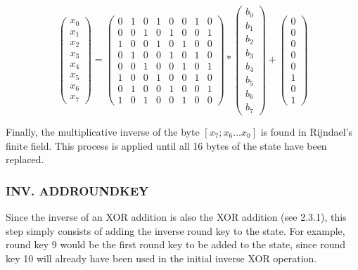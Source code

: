 \documentclass[12pt]{report}
\theoremstyle{definition}
\theoremstyle{remark}
\begin{document}
\[ 
\left( \begin{array}{c}
x_0 \\
x_1 \\
x_2 \\
x_3 \\
x_4 \\
x_5 \\
x_6 \\
x_7\end{array} \right)
=
\left( \begin{array}{cccccccc}
0 & 1 & 0 & 1 & 0 & 0 & 1 & 0 \\
0 & 0 & 1 & 0 & 1 & 0 & 0 & 1 \\
1 & 0 & 0 & 1 & 0 & 1 & 0 & 0 \\
0 & 1 & 0 & 0 & 1 & 0 & 1 & 0 \\
0 & 0 & 1 & 0 & 0 & 1 & 0 & 1 \\
1 & 0 & 0 & 1 & 0 & 0 & 1 & 0 \\
0 & 1 & 0 & 0 & 1 & 0 & 0 & 1 \\
1 & 0 & 1 & 0 & 0 & 1 & 0 & 0\end{array} \right)
*
\left( \begin{array}{c}
b_0 \\
b_1 \\
b_2 \\
b_3 \\
b_4 \\
b_5 \\
b_6 \\
b_7\end{array} \right)
+
\left( \begin{array}{c}
0 \\
0 \\
0 \\
0 \\
0 \\
1 \\
0 \\
1\end{array} \right)
\]

Finally, the multiplicative inverse of the byte $[x_7;x_6...x_0]$ is found in Rijndael's finite field. This process is applied until all 16 bytes of the state have been replaced.

\subsubsection{INV. ADDROUNDKEY}
Since the inverse of an XOR addition is also the XOR addition (see 2.3.1), this step simply consists of adding the inverse round key to the state. For example, round key 9 would be the first round key to be added to the state, since round key 10 will already have been used in the initial inverse XOR operation\cite{RoundKeyInverse}.
\end{document}
